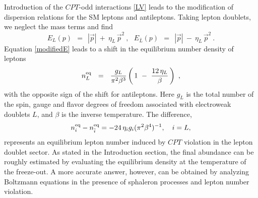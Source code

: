 \documentclass[12pt]{revtex4}
\newcommand{\eq}{{\rm eq}}
\begin{document}
Introduction of the $CPT$-odd interactions \eqref{LV} leads to the modification of 
dispersion relations for the SM leptons and antileptons. Taking lepton doublets, we neglect
the mass terms and find 
\begin{equation}
	E_L(p) ~~=~~ |\vec{p}| ~+~  \eta_L\, \vec{p}^2~, ~~~ 
E_{\bar L}(p) ~~=~~ |\vec{p}| ~-~  \eta_L\, \vec{p}^2~.
\label{modifiedE}
\end{equation}
Equation \eqref{modifiedE} leads to a shift in the equilibrium number density of leptons
\[
        n_L^\eq ~~=~~ \frac{g_L}{\pi^2 \beta^3}
			\left (\, 1 ~-~ \frac{12\,\eta_L}{\beta} \,\right)~,
\]
with the opposite sign of the shift for antileptons. Here $g_L$ is the total number of the spin, 
gauge and flavor
 degrees 
of freedom associated with electroweak doublets $L$, and 
$\beta$ is the inverse temperature. The difference,
\begin{equation}
\label{difference}
n_i^\eq - n_{\bar i}^\eq =-24\,\eta_i g_i(\pi^2 \beta^4)^{-1}, ~~~i=L,
\end{equation}
represents an equilibrium lepton number 
induced by $CPT$ violation in the lepton doublet sector. 
As stated in the Introduction section, the final abundance can be roughly
estimated by evaluating the equilibrium density at the temperature
of the freeze-out.
A more accurate answer, however, can be obtained by analyzing Boltzmann equations in the 
presence of sphaleron processes and lepton number violation.
\end{document}
